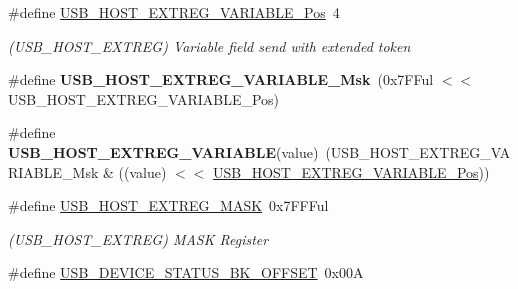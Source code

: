 \begin{DoxyCompactItemize}
\item 
\hypertarget{group___s_a_m_l21___u_s_b_ga518a47e5a0c791287a3f79373d6f542d}{}\#define \hyperlink{group___s_a_m_l21___u_s_b_ga518a47e5a0c791287a3f79373d6f542d}{U\+S\+B\+\_\+\+H\+O\+S\+T\+\_\+\+E\+X\+T\+R\+E\+G\+\_\+\+V\+A\+R\+I\+A\+B\+L\+E\+\_\+\+Pos}~4\label{group___s_a_m_l21___u_s_b_ga518a47e5a0c791287a3f79373d6f542d}

\begin{DoxyCompactList}\small\item\em (U\+S\+B\+\_\+\+H\+O\+S\+T\+\_\+\+E\+X\+T\+R\+E\+G) Variable field send with extended token \end{DoxyCompactList}\item 
\hypertarget{group___s_a_m_l21___u_s_b_gae4a6b9c9c67891e3f6a6a7cbc868c686}{}\#define {\bfseries U\+S\+B\+\_\+\+H\+O\+S\+T\+\_\+\+E\+X\+T\+R\+E\+G\+\_\+\+V\+A\+R\+I\+A\+B\+L\+E\+\_\+\+Msk}~(0x7\+F\+Ful $<$$<$ U\+S\+B\+\_\+\+H\+O\+S\+T\+\_\+\+E\+X\+T\+R\+E\+G\+\_\+\+V\+A\+R\+I\+A\+B\+L\+E\+\_\+\+Pos)\label{group___s_a_m_l21___u_s_b_gae4a6b9c9c67891e3f6a6a7cbc868c686}

\item 
\hypertarget{group___s_a_m_l21___u_s_b_ga32983f17d81fb14830bebcc1abecbb06}{}\#define {\bfseries U\+S\+B\+\_\+\+H\+O\+S\+T\+\_\+\+E\+X\+T\+R\+E\+G\+\_\+\+V\+A\+R\+I\+A\+B\+L\+E}(value)~(U\+S\+B\+\_\+\+H\+O\+S\+T\+\_\+\+E\+X\+T\+R\+E\+G\+\_\+\+V\+A\+R\+I\+A\+B\+L\+E\+\_\+\+Msk \& ((value) $<$$<$ \hyperlink{group___s_a_m_l21___u_s_b_ga518a47e5a0c791287a3f79373d6f542d}{U\+S\+B\+\_\+\+H\+O\+S\+T\+\_\+\+E\+X\+T\+R\+E\+G\+\_\+\+V\+A\+R\+I\+A\+B\+L\+E\+\_\+\+Pos}))\label{group___s_a_m_l21___u_s_b_ga32983f17d81fb14830bebcc1abecbb06}

\item 
\hypertarget{group___s_a_m_l21___u_s_b_gaf97a5b4e113d17d4b5404bef611ce388}{}\#define \hyperlink{group___s_a_m_l21___u_s_b_gaf97a5b4e113d17d4b5404bef611ce388}{U\+S\+B\+\_\+\+H\+O\+S\+T\+\_\+\+E\+X\+T\+R\+E\+G\+\_\+\+M\+A\+S\+K}~0x7\+F\+F\+Ful\label{group___s_a_m_l21___u_s_b_gaf97a5b4e113d17d4b5404bef611ce388}

\begin{DoxyCompactList}\small\item\em (U\+S\+B\+\_\+\+H\+O\+S\+T\+\_\+\+E\+X\+T\+R\+E\+G) M\+A\+S\+K Register \end{DoxyCompactList}\item 
\hypertarget{group___s_a_m_l21___u_s_b_ga9d12246fa3ef16dbf5d1454bb2880adb}{}\#define \hyperlink{group___s_a_m_l21___u_s_b_ga9d12246fa3ef16dbf5d1454bb2880adb}{U\+S\+B\+\_\+\+D\+E\+V\+I\+C\+E\+\_\+\+S\+T\+A\+T\+U\+S\+\_\+\+B\+K\+\_\+\+O\+F\+F\+S\+E\+T}~0x00\+A\label{group___s_a_m_l21___u_s_b_ga9d12246fa3ef16dbf5d1454bb2880adb}


\end{DoxyCompactItemize}
